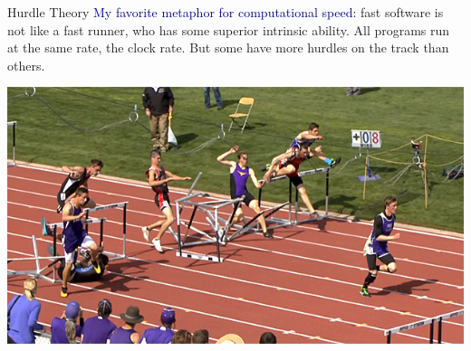 \documentclass{beamer}
\begin{document}
\begin{frame}{Hurdle Theory}
\vspace{0.5 cm}
\textcolor{darkblue}{My favorite metaphor for computational speed:} fast software is not like a fast runner, who has some superior intrinsic ability. All programs run at the same rate, the clock rate. But some have more hurdles on the track than others.

\vspace{0.25 cm}
\begin{center}
\includegraphics[width=0.7\linewidth]{hurdle9.jpg}
\end{center}
\end{frame}
\end{document}
